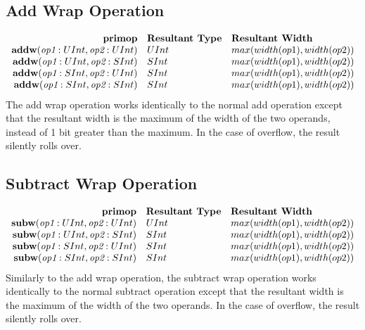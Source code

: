 \documentclass[12pt]{article}
\begin{document}
\subsection{Add Wrap Operation}
\[
\begin{array}{rll}
\text{\bf primop} & \text{\bf Resultant Type} & \text{\bf Resultant Width} \\
\text{\bf addw}(\text{\em op1}:UInt, \text{\em op2}:UInt) & UInt & max(width(op1),width(op2)) \\
\text{\bf addw}(\text{\em op1}:UInt, \text{\em op2}:SInt) & SInt & max(width(op1),width(op2)) \\
\text{\bf addw}(\text{\em op1}:SInt, \text{\em op2}:UInt) & SInt & max(width(op1),width(op2)) \\
\text{\bf addw}(\text{\em op1}:SInt, \text{\em op2}:SInt) & SInt & max(width(op1),width(op2)) \\
\end{array}
\]
The add wrap operation works identically to the normal add operation except that the resultant width is the maximum of the width of the two operands, instead of 1 bit greater than the maximum.
In the case of overflow, the result silently rolls over.

\subsection{Subtract Wrap Operation}
\[
\begin{array}{rll}
\text{\bf primop} & \text{\bf Resultant Type} & \text{\bf Resultant Width} \\
\text{\bf subw}(\text{\em op1}:UInt, \text{\em op2}:UInt) & UInt & max(width(op1),width(op2)) \\
\text{\bf subw}(\text{\em op1}:UInt, \text{\em op2}:SInt) & SInt & max(width(op1),width(op2)) \\
\text{\bf subw}(\text{\em op1}:SInt, \text{\em op2}:UInt) & SInt & max(width(op1),width(op2)) \\
\text{\bf subw}(\text{\em op1}:SInt, \text{\em op2}:SInt) & SInt & max(width(op1),width(op2)) \\
\end{array}
\]
Similarly to the add wrap operation, the subtract wrap operation works identically to the normal subtract operation except that the resultant width is the maximum of the width of the two operands.
In the case of overflow, the result silently rolls over.
\end{document}
